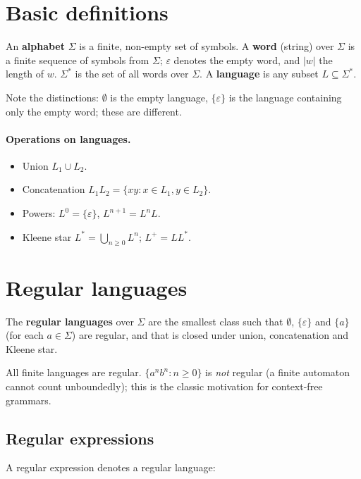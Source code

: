 \section{Basic definitions}

\begin{definition}
An \textbf{alphabet} $\Sigma$ is a finite, non-empty set of symbols. A \textbf{word} (string)
over $\Sigma$ is a finite sequence of symbols from $\Sigma$; $\varepsilon$ denotes the empty
word, and $|w|$ the length of $w$. $\Sigma^*$ is the set of all words over $\Sigma$. A
\textbf{language} is any subset $L \subseteq \Sigma^*$.
\end{definition}

Note the distinctions: $\emptyset$ is the empty language, $\{\varepsilon\}$ is the language
containing only the empty word; these are different.

\paragraph{Operations on languages.}
\begin{itemize}
  \item Union $L_1 \cup L_2$.
  \item Concatenation $L_1 L_2 = \{xy : x\in L_1, y \in L_2\}$.
  \item Powers: $L^0 = \{\varepsilon\}$, $L^{n+1} = L^n L$.
  \item Kleene star $L^* = \bigcup_{n\ge 0} L^n$; $L^+ = L L^*$.
\end{itemize}

\section{Regular languages}

\begin{definition}
The \textbf{regular languages} over $\Sigma$ are the smallest class such that $\emptyset$,
$\{\varepsilon\}$ and $\{a\}$ (for each $a\in\Sigma$) are regular, and that is closed under
union, concatenation and Kleene star.
\end{definition}

All finite languages are regular. $\{a^n b^n : n\ge 0\}$ is \emph{not} regular (a finite
automaton cannot count unboundedly); this is the classic motivation for context-free
grammars.

\subsection{Regular expressions}
A regular expression denotes a regular language:

